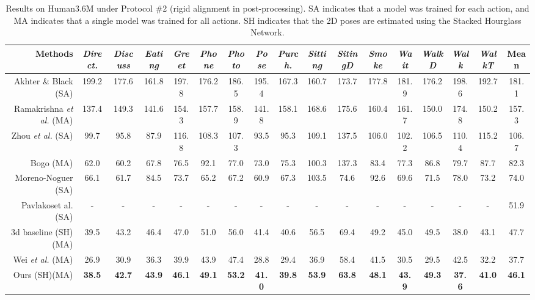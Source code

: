\documentclass[10pt,journal,compsoc]{IEEEtran}
\begin{document}
\begin{table*}[!t]
 \caption{Results on Human3.6M under Protocol \#2 (rigid alignment in post-processing). SA indicates that a model was trained for each action, and MA indicates that a single model was trained for all actions. SH indicates that the 2D poses are estimated using the Stacked Hourglass Network.}
 \label{tab:Results-on-Human3.6M_rigid}
 \small
 \centering
 \setlength{\tabcolsep}{0.6pt}
 \renewcommand{\arraystretch}{1.25}
 \begin{tabular}{ r  ||c|c|c|c|c|c|c|c|c|c|c|c|c|c|c||c }
  \hline
   {Methods} & \emph{Direct.} & \emph{Discuss} & \emph{Eating} & \emph{Greet} & \emph{Phone} & \emph{Photo} & \emph{Pose} & \emph{Purch.} & \emph{Sitting} & \emph{SitingD} &\emph{Smoke} &\emph{Wait} &\emph{WalkD} &\emph{Walk} &\emph{WalkT}  &\textbf{Mean} \\
  \hline
  \hline
  Akhter \& Black\cite{akhter2015pose} (SA) & 199.2 &  177.6  & 161.8  & 197.8  & 176.2  & 186.5  & 195.4 & 167.3 & 160.7  & 173.7  & 177.8 & 181.9 & 176.2 & 198.6 &192.7 &181.1\\
  Ramakrishna \emph{et al.} \cite{ramakrishna2012reconstructing} (MA) & 137.4 &  149.3  & 141.6  & 154.3 & 157.7  & 158.9  & 141.8 & 158.1 & 168.6 &175.6 & 160.4  & 161.7  & 150.0 & 174.8 & 150.2&157.3\\
  Zhou \emph{et al.} \cite{zhou2017sparse} (SA)  & 99.7 &  95.8  & 87.9  & 116.8  & 108.3  & 107.3  & 93.5 & 95.3 & 109.1 &137.5 & 106.0  & 102.2  & 106.5& 110.4 & 115.2 &106.7\\
  Bogo\cite{bogo2016keep} (MA) & 62.0&  60.2  & 67.8  & 76.5  & 92.1  & 77.0 & 73.0 & 75.3 & 100.3 &137.3 & 83.4  & 77.3  & 86.8 & 79.7 & 87.7 &82.3\\
  Moreno-Noguer \cite{moreno20163d} (SA) & 66.1 &  61.7  & 84.5  & 73.7  & 65.2 & 67.2 & 60.9& 67.3& 103.5 &74.6 & 92.6  & 69.6  & 71.5 & 78.0 & 73.2 &74.0\\
  Pavlakos{et al.} \cite{pavlakos2016coarse} (SA) & -&  -  & -  & -  & -  & -  & - & - & - &- & -  & -  & - & -& - &51.9\\
  3d baseline (SH)(MA) \cite{martinez2017simple}  & 39.5&  43.2  & 46.4 & 47.0 & 51.0  & 56.0 & 41.4 & 40.6 & 56.5 &69.4 & 49.2  & 45.0 & 49.5& 38.0 & 43.1 &47.7\\
   Wei \emph{et al.} (MA)\cite{yang20183d}\footnotemark[1]  & 26.9 &  {30.9} & {36.3} & {39.9}  & {43.9} & {47.4}  & {28.8} &{29.4} &  {36.9} &{ 58.4} & {41.5}  &{30.5}  &  {29.5}& {42.5} & {32.2} &{37.7}\\
  \hline
  \hline
    Ours (SH)(MA) & \textbf{38.5} &  \textbf{42.7}  & \textbf{43.9 } & \textbf{46.1}  & \textbf{49.1}  & \textbf{53.2} & \textbf{41.0} & \textbf{39.8} & \textbf{53.9} &\textbf{63.8} & \textbf{48.1}  & \textbf{43.9}  & \textbf{49.3} & \textbf{37.6} & \textbf{41.0} &\textbf{46.1}\\
    \hline

 \end{tabular}
  \textcolor{black}{}

\end{table*}
\end{document}
